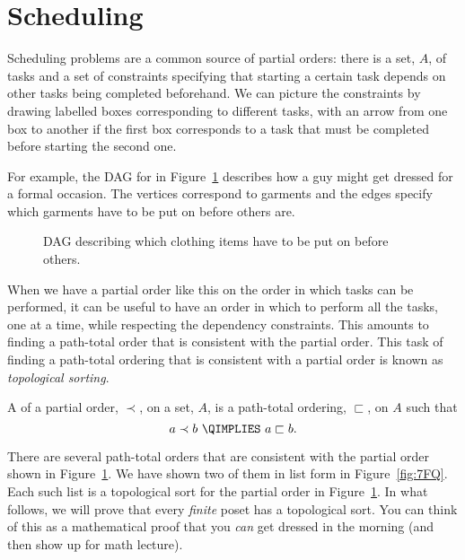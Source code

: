 \begin{problems}
\classproblems
{}
\end{problems}

\section{Scheduling}\label{sched_sec}

Scheduling problems are a common source of partial orders: there is a set,
$A$, of tasks and a set of constraints specifying that starting a certain
task depends on other tasks being completed beforehand.  We can picture
the constraints by drawing labelled boxes corresponding to different
tasks, with an arrow from one box to another if the first box corresponds
to a task that must be completed before starting the second one.

For example, the DAG for in Figure~\ref{fig:7FP} describes how a guy
might get dressed for a formal occasion.  The vertices correspond to
garments and the edges specify which garments have to be put on before
others are.

\begin{figure}


\caption{DAG describing which clothing items have to be put on before others.}

\label{fig:7FP}

\end{figure}

When we have a partial order like this on the order in which tasks can be
performed, it can be useful to have an order in which to perform all
the tasks, one at a time, while respecting the dependency constraints.
This amounts to finding a path-total order that is consistent with the
partial order.  This task of finding a path-total ordering that is
consistent with a partial order is known as \emph{topological
  sorting}.


\begin{definition}
  A  of a partial order, $\prec$, on a set, $A$, is
  a path-total ordering, $\sqsubset$, on $A$ such that
\[
a \prec b\ \QIMPLIES\  a \sqsubset b.
\]
\end{definition}

There are several path-total orders that are consistent with the partial
order shown in Figure~\ref{fig:7FP}.  We have shown two of them in
list form in Figure~\ref{fig:7FQ}.  Each such list is a topological
sort for the partial order in Figure~\ref{fig:7FP}.  In what follows,
we will prove that every \emph{finite} poset has a topological sort.
You can think of this as a mathematical proof that you \emph{can} get
dressed in the morning (and then show up for math lecture).

